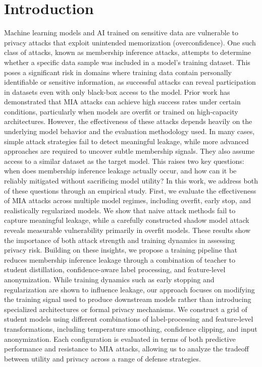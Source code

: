 \documentclass[conference]{IEEEtran}
\begin{document}
\section{Introduction}
Machine learning models and AI trained on sensitive data are vulnerable to privacy attacks that exploit unintended memorization (overconfidence). One such class of attacks, known as membership inference attacks, attempts to determine whether a specific data sample was included in a model’s training dataset. This poses a significant risk in domains where training data contain personally identifiable or sensitive information, as successful attacks can reveal participation in datasets even with only black-box access to the model.
Prior work has demonstrated that MIA attacks can achieve high success rates under certain conditions, particularly when models are overfit or trained on high-capacity architectures. However, the effectiveness of these attacks depends heavily on the underlying model behavior and the evaluation methodology used. In many cases, simple attack strategies fail to detect meaningful leakage, while more advanced approaches are required to uncover subtle membership signals. They also assume access to a similar dataset as the target model. This raises two key questions: when does membership inference leakage actually occur, and how can it be reliably mitigated without sacrificing model utility?
In this work, we address both of these questions through an empirical study. First, we evaluate the effectiveness of MIA attacks across multiple model regimes, including overfit, early stop, and realistically regularized models. We show that naive attack methods fail to capture meaningful leakage, while a carefully constructed shadow model attack reveals measurable vulnerability primarily in overfit models. These results show the importance of both attack strength and training dynamics in assessing privacy risk.
Building on these insights, we propose a training pipeline that reduces membership inference leakage through a combination of teacher to student distillation, confidence-aware label processing, and feature-level anonymization. While training dynamics such as early stopping and regularization are shown to influence leakage, our approach focuses on modifying the training signal used to produce downstream models rather than introducing specialized architectures or formal privacy mechanisms.
We construct a grid of student models using different combinations of label-processing and feature-level transformations, including temperature smoothing, confidence clipping, and input anonymization. Each configuration is evaluated in terms of both predictive performance and resistance to MIA attacks, allowing us to analyze the tradeoff between utility and privacy across a range of defense strategies.
\end{document}

